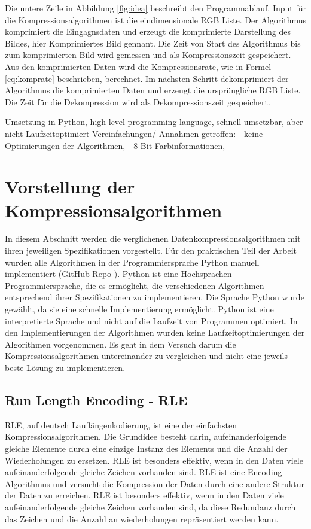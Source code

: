 \documentclass[conference]{IEEEtran}
\begin{document}
Die untere Zeile in Abbildung \ref{fig:idea} beschreibt den Programmablauf.
Input für die Kompressionsalgorithmen ist die eindimensionale RGB Liste.
Der Algorithmus komprimiert die Eingagnsdaten und erzeugt die komprimierte
Darstellung des Bildes, hier Komprimiertes Bild gennant.
Die Zeit von Start des Algorithmus bis zum komprimierten Bild wird gemessen
und als Kompressionszeit gespeichert.
Aus den komprimierten Daten wird die Kompressionsrate, wie in Formel \ref{eq:komprate}
beschrieben, berechnet.
Im nächsten Schritt dekomprimiert der Algorithmus die komprimierten Daten und
erzeugt die ursprüngliche RGB Liste.
Die Zeit für die Dekompression wird als Dekompressionszeit gespeichert.









Umsetzung in Python, high level programming language, schnell umsetzbar, aber nicht
Laufzeitoptimiert
Vereinfachungen/ Annahmen getroffen:
- keine Optimierungen der Algorithmen,
- 8-Bit Farbinformationen,




\section{Vorstellung der Kompressionsalgorithmen}

In diesem Abschnitt werden die verglichenen Datenkompressionsalgorithmen
mit ihren jeweiligen Spezifikationen vorgestellt.
Für den praktischen Teil der Arbeit wurden alle
Algorithmen in der Programmiersprache Python manuell implementiert
(GitHub Repo \cite{nick}).
Python ist eine Hochsprachen-Programmiersprache, die es ermöglicht,
die verschiedenen Algorithmen entsprechend ihrer Spezifikationen zu implementieren.
Die Sprache Python wurde gewählt, da sie eine schnelle Implementierung ermöglicht.
Python ist eine interpretierte Sprache und nicht auf die Laufzeit von Programmen
optimiert. \cite{nadav}
In den Implementierungen der Algorithmen wurden keine Laufzeitoptimierungen der
Algorithmen vorgenommen.
Es geht in dem Versuch darum die Kompressionsalgorithmen untereinander zu
vergleichen und nicht eine jeweils beste Lösung zu implementieren.


\subsection{Run Length Encoding - RLE}

RLE, auf deutsch Lauflängenkodierung, ist eine der einfachsten Kompressionsalgorithmen.
Die Grundidee besteht darin, aufeinanderfolgende gleiche Elemente durch
eine einzige Instanz des Elements und die Anzahl der Wiederholungen zu ersetzen.
RLE ist besonders effektiv, wenn in den Daten viele aufeinanderfolgende
gleiche Zeichen vorhanden sind.
RLE ist eine Encoding Algorithmus und versucht die Kompression der Daten
durch eine andere Struktur der Daten zu erreichen.
RLE ist besonders effektiv, wenn in den Daten viele aufeinanderfolgende
gleiche Zeichen vorhanden sind, da diese Redundanz durch das Zeichen und die
Anzahl an wiederholungen repräsentiert werden kann.
\end{document}
